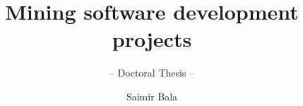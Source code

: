 \documentclass[graybox,envcountchap]{svmono}
\begin{document}
\author{Saimir Bala}
\title{Mining software development projects}
\subtitle{-- Doctoral Thesis --}

\frontmatter%

%

%
%
%

\tableofcontents

\listoffigures

\listoftables



\mainmatter%
%

%



%

















%








\backmatter%

%

\printindex

\end{document}
